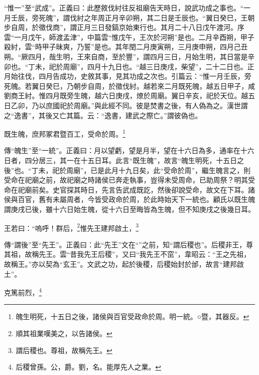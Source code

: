 {\noindent\shu{}\fzkt “惟一”至“武成”。正義曰：此歷敘伐紂往反祖廟告天時日，說武功成之事也。“一月壬辰，旁死魄”，謂伐紂之年周正月辛卯朔，其二日是壬辰也。“翼日癸巳，王朝步自周，於徵伐商”，謂正月三日發鎬京始東行也。其月二十八日戊午渡河。序雲“一月戊午，師渡孟津”，中篇雲“惟戊午，王次於河朔”是也。二月辛酉朔，甲子殺紂，雲“時甲子昧爽，乃誓”是也。其年閏二月庚寅朔，三月庚申朔，四月己丑朔。“厥四月，哉生明，王來自商，至於豐”，謂四月三日，月始生明，其日當是辛卯也。“丁未，祀於周廟”，四月十九日也。“越三日庚戌，柴望”，二十二日也。正月始往伐，四月告成功，史敘其事，見其功成之次也。引篇云：“惟一月壬辰，旁死魄。若翼日癸巳，乃朝步自周，於徵伐紂。越若來二月既死魄，越五日甲子，咸劉商王紂。惟四月既旁生魄，越六日庚戌，燎於周廟。翼日辛亥，祀於天位。越五日乙卯，乃以庶國祀於周廟。”與此經不同。彼是焚書之後，有人偽為之。漢世謂之“逸書”，其後又亡其篇。云：“逸書，建武之際亡。”謂彼偽也。 \par}

既生魄，庶邦冢君暨百工，受命於周。\footnote{魄生明死，十五日之後，諸侯與百官受政命於周。明一統。○暨，其器反。}

{\noindent\zhuan{}\fzbyks 傳“魄生”至“一統”。正義曰：月以望虧，望是月半，望在十六日為多，通率在十六日者，四分居三，其一在十五日耳。此言“既生魄”，故言“魄生明死，十五日之後”也。“丁未，祀於周廟”，已是此月十九日矣，此“受命於周”，繼生魄言之，則受命在祀廟之前，故祀廟之時諸侯已奔走執事，豈得未受周命，已助周祭？明其受命在祀廟前矣。史官探其時日，先言告武成既訖，然後卻說受命，故文在下耳。諸侯與百官，舊有未屬周者，今皆受政命於周，於此時始天下一統也。顧氏以既生魄謂庚戌已後，雖十六日始生魄，從十六日至晦皆為生魄，但不知庚戌之後幾日耳。 \par}

王若曰：“嗚呼！群后，\footnote{順其祖業嘆美之，以告諸侯。}惟先王建邦啟土，\footnote{謂后稷也。尊祖，故稱先王。}

{\noindent\zhuan{}\fzbyks 傳“謂後”至“先王”。正義曰：此“先王”文在“”之前，知“謂后稷也”。后稷非王，尊其祖，故稱先王。雲“昔我先王后稷”，又曰“我先王不窋”，韋昭云：“王之先祖，故稱王。”亦以契為“玄王”。文武之功，起於後稷，后稷始封於邰，故言“建邦啟土”。 \par}

克篤前烈，\footnote{后稷曾孫。公，爵。劉，名。能厚先人之業。}

